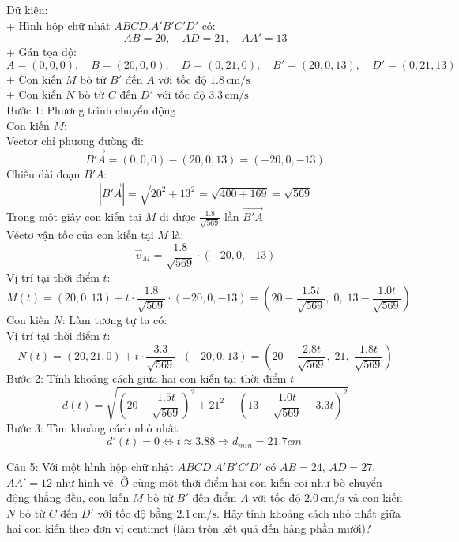\documentclass[a4paper,12pt]{article}
\begin{document}
Dữ kiện:\\
+ Hình hộp chữ nhật \(ABCD.A'B'C'D'\) có:\\
\[
AB = 20,\quad AD = 21,\quad AA' = 13
\]
+ Gán tọa độ:
\[
A = (0, 0, 0),\quad B = (20, 0, 0),\quad D = (0, 21, 0),\quad B' = (20, 0, 13),\quad D' = (0, 21, 13)
\]
+ Con kiến \(M\) bò từ \(B'\) đến \(A\) với tốc độ \(1.8\, \text{cm/s}\)\\
+ Con kiến \(N\) bò từ \(C\) đến \(D'\) với tốc độ \(3.3\, \text{cm/s}\)\\
Bước 1: Phương trình chuyển động\\
Con kiến \(M\):\\
Vector chỉ phương đường đi:
\[
\overrightarrow{B'A} = (0, 0, 0) - (20, 0, 13) = ( -20, 0, -13 )
\]
Chiều dài đoạn \(B'A\):
\[
|\overrightarrow{B'A}| = \sqrt{20^2 + 13^2} = \sqrt{400 + 169} = \sqrt{569}
\]
Trong một giây con kiến tại \(M\) đi được \(\frac{1.8}{\sqrt{569}}\) lần \(\overrightarrow{B'A}\)\\
Véctơ vận tốc của con kiến tại \(M\) là:
\[
\overrightarrow{v}_M = \frac{1.8}{\sqrt{569}} \cdot ( -20, 0, -13 )
\]
Vị trí tại thời điểm \(t\):
\[
M(t) = (20, 0, 13) + t \cdot \frac{1.8}{\sqrt{569}} \cdot ( -20, 0, -13 )
= \left( 20 - \frac{1.5t}{\sqrt{569}},\; 0,\; 13 - \frac{1.0t}{\sqrt{569}} \right)
\]
Con kiến \(N\): Làm tương tự ta có:\\
Vị trí tại thời điểm \(t\):
\[
N(t) = (20, 21, 0) + t \cdot \frac{3.3}{\sqrt{569}} \cdot (-20, 0, 13)
= \left( 20 - \frac{2.8t}{\sqrt{569}},\; 21,\; \frac{1.8t}{\sqrt{569}} \right)
\]
Bước 2: Tính khoảng cách giữa hai con kiến tại thời điểm \(t\)
\[
d(t) = \sqrt{\left(20 - \frac{1.5t}{\sqrt{569}}\right)^2 + 21^2 + \left(13 - \frac{1.0t}{\sqrt{569}} - 3.3t\right)^2}
\]
Bước 3: Tìm khoảng cách nhỏ nhất
\[
d'(t)=0\Leftrightarrow t \approx 3.88 \Rightarrow d_{min}=21.7cm\
\]




Câu 5: 
Với một hình hộp chữ nhật \(ABCD.A'B'C'D'\) có \(AB=24\), \(AD=27\), \(AA'=12\) như hình vẽ. Ở cùng một thời điểm hai con kiến coi như bò chuyển động thẳng đều, con kiến \(M\) bò từ \(B'\) đến điểm \(A\) với tốc độ \(2.0\,\mathrm{cm/s}\) và con kiến \(N\) bò từ \(C\) đến \(D'\) với tốc độ bằng \(2.1\,\mathrm{cm/s}\). Hãy tính khoảng cách nhỏ nhất giữa hai con kiến theo đơn vị centimet (làm tròn kết quả đến hàng phần mười)?
\end{document}
